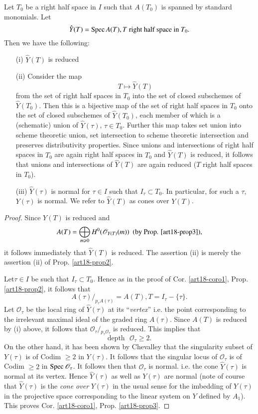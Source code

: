 \setcounter{coro}{0}
\begin{coro}%
Let $T_0$ be a right half space in $I$ such that $A(T_0)$ is spanned by standard monomials. Let
$$
\hat{Y} (T) = \operatorname{Spec} A(T), T \text{ ~ right half space in ~} T_0.
$$
Then we have the following:
\begin{itemize}
\item[(i)] $\hat{Y} (T)$ is reduced
\item[(ii)] Consider the map
$$
T \mapsto \hat{Y}(T)
$$
from the set of right half spaces in $T_0$ into the set of closed subschemes of $\hat{Y} (T_0)$. Then this is a bijective map of the set of right half spaces in $T_0$ onto the set of closed subschemes of $\hat{Y}(T_0)$, each member of which is a (schematic) union of $\hat{Y}(\tau)$, $\tau \in T_0$. Further this map takes set union into scheme theoretic union, set intersection to scheme theoretic intersection and preserves distributivity properties. Since unions and intersections of right half spaces in $T_0$ are again right half spaces in $T_0$ and $\hat{Y}(T)$ is reduced, it follows that unions and intersections of $\hat{Y}(T)$ are again reduced ($T$ right half spaces in $T_0$).

\item[(iii)] $\hat{Y}(\tau)$ is normal for $\tau \in I$ such that $I_\tau \subset T_0$. In particular, for such  a $\tau$, $Y(\tau)$ is normal. We refer to $\hat{Y}(T)$ as cones over $Y(T)$.
\end{itemize}
\end{coro}

\begin{proof}
Since $Y(T)$ is reduced and
$$
A(T) = \bigoplus\limits_{m \geqslant 0} H^0 (\mathscr{O}_{Y(T)} (m))  ~ \text{ (by Prop. \ref{art18-prop3})},
$$
it follows immediately that $\hat{Y}(T)$ is reduced. The assertion (ii) is merely the assertion (ii) of Prop. \ref{art18-prop2}.

Let\pageoriginale $\tau \in I$ be such that $I_\tau \subset T_0$. Hence as in the proof of Cor. \ref{art18-coro1}, Prop. \ref{art18-prop2}, it follows that 
$$
A(\tau)/_{p_\tau A(\tau)} = A(T), T = I_\tau - \{\tau\}.
$$
Let $\mathscr{O}_\tau$ be the local ring of $\hat{Y}(\tau)$  at its ``\textit{vertex}'' i.e. the point corresponding to the irrelevant maximal ideal of the graded ring $A(\tau)$. Since $A(T)$ is reduced by (i) above, it follows that $\mathscr{O}_\tau/{}_{p_\tau \mathscr{O}_\tau}$ is reduced. This implies that
$$
\text{depth ~} \mathscr{O}_\tau \geqslant 2.
$$
On the other hand, it has been shown by Chevalley \cite{art18-key6} that the singularity subset of $Y(\tau)$ is of Codim $\geqslant 2$ in $Y(\tau)$. It follows that the singular locus of $\mathscr{O}_\tau$ is of Codim $\geqslant 2$ in $\operatorname{Spec} \mathscr{O}_\tau$. It follows then that $\mathscr{O}_\tau$ is normal. i.e. the cone $\hat{Y}(\tau)$ is normal at its vertex. Hence $\hat{Y}(\tau)$ as well as $Y(\tau)$ are normal (note of course that $\hat{Y}(\tau)$ is the {\em cone over} $Y(\tau)$  in the usual sense for the imbedding of $Y(\tau)$ in the projective space corresponding to the linear system on $Y$ defined by $A_1$). This proves Cor. \ref{art18-coro1}, Prop. \ref{art18-prop3}. 
\end{proof}

